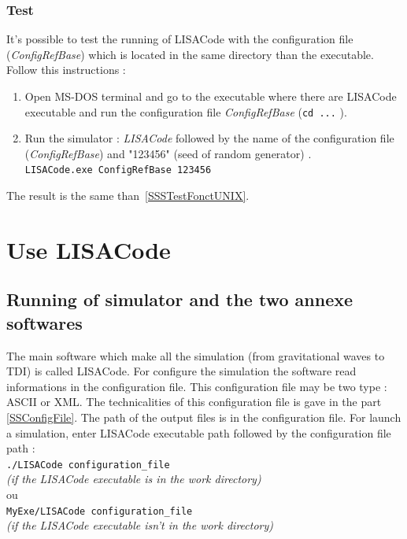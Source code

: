 \documentclass[a4paper,english,12pt]{article}
\begin{document}
\subsubsection{Test}
\label{SSSTestFonctWindows}
It's possible to test the running of LISACode with the configuration file ({\it ConfigRefBase}) which is located in the same directory than the executable. Follow this instructions : \\
\begin{enumerate}
\item Open MS-DOS terminal and go to the executable where there are LISACode executable and run the configuration file {\it ConfigRefBase} (\texttt{cd ...} ).
\item Run the simulator : {\it LISACode} followed by the name of the configuration file  ({\it ConfigRefBase}) and "123456" (seed of random generator) . \\
\hphantom{aaaaa}\texttt{LISACode.exe ConfigRefBase 123456}
\end{enumerate}
The result is the same than~\ref{SSSTestFonctUNIX}.


\newpage

\section{Use LISACode}
\label{SUse}
\subsection{Running of simulator and the two annexe softwares}
\label{SSExecution}
The main software which make all the simulation (from gravitational waves to TDI) is called LISACode.
For configure the simulation the software read informations in the configuration file. This configuration file may be two type : ASCII or XML. The technicalities of this configuration file is gave in the part \ref{SSConfigFile}. The path of the output files is in the configuration file. For launch a simulation, enter LISACode executable path followed by the configuration file path : \\
\hphantom{aaa}\texttt{./LISACode configuration\_file}\\
{\it(if the LISACode executable is in the work directory)}\\
\hphantom{aaa}ou\\
\hphantom{aaa}\texttt{MyExe/LISACode configuration\_file}\\
{\it(if the LISACode executable isn't in the work directory)}\\
\end{document}
